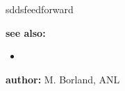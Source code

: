 \begin{sddsprog}{sddsfeedforward}
\item \textbf{see also:}
    \begin{itemize}
    \item {}
    \end{itemize}
\item \textbf{author:} M. Borland, ANL
\end{sddsprog}
